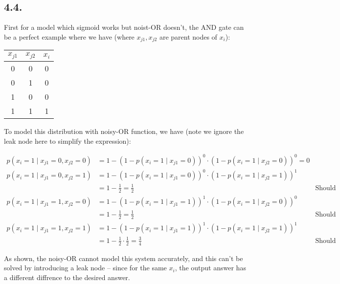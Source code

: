 \documentclass[11pt]{article}
\begin{document}
\subsection*{4.4.}

First for a model which sigmoid works but noist-OR doesn't, the AND gate can be a perfect example where we have (where $x_{j1}, x_{j2}$ are parent nodes of $x_i$):

\begin{table}[H]
    \centering
    \begin{tabular}{ c  c | c }
        \hline
        $x_{j1}$ & $x_{j2}$ & $x_i$ \\
        \hline
        0 & 0 & 0 \\
        0 & 1 & 0 \\
        1 & 0 & 0 \\
        1 & 1 & 1
    \end{tabular}
\end{table}

To model this distribution with noisy-OR function, we have (note we ignore the leak node here to simplify the expression):

\begin{align*}
    p(x_i = 1 \mid x_{j1} = 0, x_{j2} = 0) &= 1 - (1 - p(x_i = 1 \mid x_{j1} = 0))^{0} \cdot (1 - p(x_i = 1 \mid x_{j2} = 0))^{0} = 0 \\
    p(x_i = 1 \mid x_{j1} = 0, x_{j2} = 1) &= 1 - (1 - p(x_i = 1 \mid x_{j1} = 0))^{0} \cdot (1 - p(x_i = 1 \mid x_{j2} = 1))^{1}\\ &= 1 - \frac{1}{2}= \frac{1}{2} & \text{Should be 0}\\
    p(x_i = 1 \mid x_{j1} = 1, x_{j2} = 0) &= 1 - (1 - p(x_i = 1 \mid x_{j1} = 1))^{1} \cdot (1 - p(x_i = 1 \mid x_{j2} = 0))^{0} \\ &= 1 - \frac{1}{2}= \frac{1}{2} & \text{Should be 0}\\
    p(x_i = 1 \mid x_{j1} = 1, x_{j2} = 1) &= 1 - (1 - p(x_i = 1 \mid x_{j1} = 1))^{1} \cdot (1 - p(x_i = 1 \mid x_{j2} = 1))^{1} \\ &= 1 - \frac{1}{2} \cdot \frac{1}{2}= \frac{3}{4} & \text{Should be 1}    %
\end{align*}

As shown, the noisy-OR cannot model this system accurately, and this can't be solved by introducing a leak node -- since for the same $x_i$, the output answer has a different diffrence to the desired answer.\newline
\end{document}
